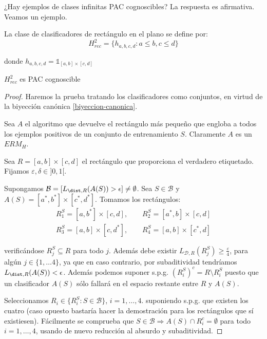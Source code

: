 ¿Hay ejemplos de clases infinitas PAC cognoscibles? La respuesta es afirmativa. Veamos un ejemplo.

\begin{example}
  \begin{definition}

  La clase de clasificadores de rectángulo en el plano se define por:
  \[H^2_{rec} = \{ h_{a,b,c,d}: a\le b, c\le d\}\]

  donde $h_{a,b,c,d} = \mathds{1}_{[a,b]\times [c,d]}$
  \end{definition}


    \begin{fact}
    $H_{rec}^2$ es PAC cognoscible
    \end{fact}

    \begin{proof}
    Haremos la prueba tratando los clasificadores como conjuntos, en virtud de la biyección canónica \ref{biyeccion-canonica}.
    
    Sea $A$ el algoritmo que devuelve el rectángulo más pequeño que engloba a todos los ejemplos positivos de un conjunto 
    de entrenamiento $S$. Claramente $A$ es un $ERM_H$.

    Sea $R= [a,b]\times [c,d]$ el rectángulo que proporciona el verdadero etiquetado. Fijamos $\varepsilon, \delta \in ]0,1[$.
    
    Supongamos $\mathcal{B} = [L_{\dist,R}(A(S)) > \epsilon] \neq \emptyset$. Sea $S\in \mathcal{B}$ y 
    $A(S) = [a^{\ast}, b^{\ast}] \times [c^{\ast}, d^{\ast}]$. Tomamos los rectángulos:
    \begin{align*} 
    R_1^S = [a,b^{\ast}] \times [c,d], \qquad R_2^S = [a^{\ast},b] \times [c,d] \\ 
    R_3^S =[a,b] \times [c,d^{\ast}],   \qquad R_4^S = [a,b] \times [c^{\ast},d]     
    \end{align*}
 
    verificándose $R_j^S \subseteq R$ para todo $j$. Además debe existir $L_{\mathcal{D},R}(R_j^S) \ge \frac{\varepsilon}{4}$, 
    para algún $j\in \{1, \ldots 4\}$, ya que en caso contrario, por subaditividad tendríamos $L_{\dist,R}(A(S)) < \epsilon$. 
    Además podemos suponer s.p.g. $(R_i^S)^c = R\setminus R_i^S$ puesto que un clasificador $A(S)$ sólo fallará en el
    espacio restante entre $R$ y $A(S)$.
    
    Seleccionamos $R_i \in \{R_i^S: S\in \mathcal{B}\}$, $i=1, \ldots, 4$. suponiendo s.p.g. que existen los cuatro (caso opuesto 
    bastaría hacer la demostración para los rectángulos que sí existiesen). Fácilmente se comprueba que 
    $S\in \mathcal{B} \Rightarrow A(S) \cap R_i^c = \emptyset$ para todo $i=1, \ldots, 4$, usando de nuevo reducción al 
    absurdo y subaditividad.
    

\end{proof}
\end{example}
